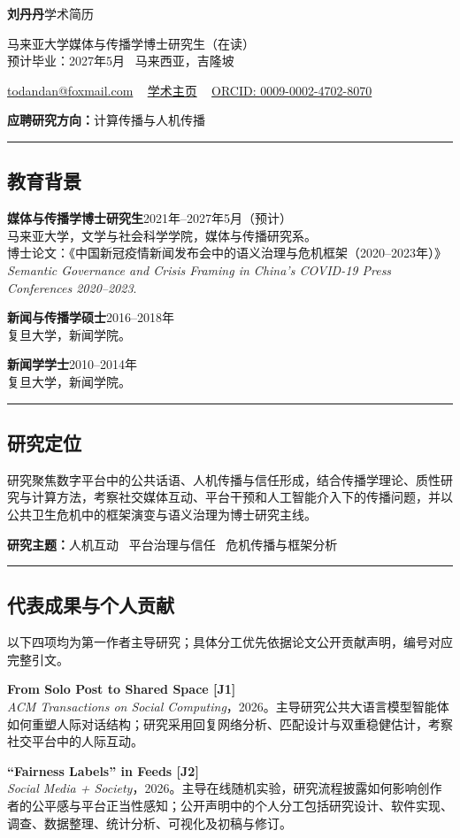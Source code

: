 \documentclass[a4paper,11pt]{article}
\newcommand{\sep}{{\,\textperiodcentered\,\,}}
\newcommand{\hsep}{\noindent\textcolor{teal}{\rule{\textwidth}{0.5pt}}}
\newcommand{\block}[1]{\par\addvspace{7pt}\Needspace{5\baselineskip}\hsep\vspace{-8pt}\subsection*{#1}}
\begin{document}
\thispagestyle{opening}
{\fontsize{25}{30}\selectfont\color{navy}\textbf{刘丹丹}}\hfill{\small 学术简历}\par
{\small 马来亚大学媒体与传播学博士研究生（在读）\\
预计毕业：2027年5月 \sep 马来西亚，吉隆坡}\par
{\small\href{mailto:todandan@foxmail.com}{todandan@foxmail.com} \sep
\href{https://s2134717ldd.github.io/smiledan713.github.io/}{学术主页} \sep
\href{https://orcid.org/0009-0002-4702-8070}{ORCID: 0009-0002-4702-8070}}\par
{\small\textbf{应聘研究方向：}计算传播与人机传播}

\block{教育背景}
\textbf{媒体与传播学博士研究生}\hfill 2021年--2027年5月（预计）\\
马来亚大学，文学与社会科学学院，媒体与传播研究系。\\
{\small 博士论文：《中国新冠疫情新闻发布会中的语义治理与危机框架（2020--2023年）》\\
\emph{Semantic Governance and Crisis Framing in China's COVID-19 Press Conferences 2020--2023}.}

\textbf{新闻与传播学硕士}\hfill 2016--2018年\\
复旦大学，新闻学院。

\textbf{新闻学学士}\hfill 2010--2014年\\
复旦大学，新闻学院。

\block{研究定位}
研究聚焦数字平台中的公共话语、人机传播与信任形成，结合传播学理论、质性研究与计算方法，考察社交媒体互动、平台干预和人工智能介入下的传播问题，并以公共卫生危机中的框架演变与语义治理为博士研究主线。
\par{\small\textbf{研究主题：}人机互动 \sep 平台治理与信任 \sep 危机传播与框架分析}

\block{代表成果与个人贡献}
{\small 以下四项均为第一作者主导研究；具体分工优先依据论文公开贡献声明，编号对应完整引文。}\par
{}
\textbf{From Solo Post to Shared Space [J1]}\\
{\small \emph{ACM Transactions on Social Computing}，2026。主导研究公共大语言模型智能体如何重塑人际对话结构；研究采用回复网络分析、匹配设计与双重稳健估计，考察社交平台中的人际互动。}

\textbf{“Fairness Labels” in Feeds [J2]}\\
{\small \emph{Social Media + Society}，2026。主导在线随机实验，研究流程披露如何影响创作者的公平感与平台正当性感知；公开声明中的个人分工包括研究设计、软件实现、调查、数据整理、统计分析、可视化及初稿与修订。}
\end{document}
